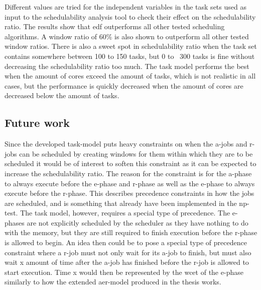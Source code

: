 \documentclass{kththesis}
\begin{document}
Different values are tried for the independent variables in the task sets used as input to the
schedulability analysis tool to check their effect on the schedulability ratio. The results show
that \acrshort{edf} outperforms all other tested scheduling algorithms. A window ratio of 60\% is
also shown to outperform all other tested window ratios. There is also a sweet spot in
schedulability ratio when the task set contains somewhere between 100 to 150 tasks, but 0 to ~300
tasks is fine without decreasing the schedulability ratio too much. The task model performs the best
when the amount of cores exceed the amount of tasks, which is not realistic in all cases, but the
performance is quickly decreased when the amount of cores are decreased below the amount of tasks.







\subsection{Future work}\label{sec:future_work}

Since the developed task-model puts heavy constraints on when the \acrshort{a}-jobs and
\acrshort{r}-jobs can be scheduled by creating windows for them within which they are to be
scheduled it would be of interest to soften this constraint as it can be expected to increase the
schedulability ratio. The reason for the constraint is for the \acrshort{a}-phase to always execute
before the \acrshort{e}-phase and \acrshort{r}-phase as well as the \acrshort{e}-phase to always
execute before the \acrshort{r}-phase. This describes precedence constraints in how the jobs
are scheduled, and is something that already have been implemented in the \acrshort{np}-test. The task model,
however, requires a special type of precedence. The \acrshort{e}-phases are not explicitly scheduled
by the scheduler as they have nothing to do with the memory, but they are still required to finish
execution before the \acrshort{r}-phase is allowed to begin. An idea then could be to pose a special
type of precedence constraint where a \acrshort{r}-job must not only wait for its \acrshort{a}-job
to finish, but must also wait x amount of time after the \acrshort{a}-job has finished before the
\acrshort{r}-job is allowed to start execution. Time x would then be represented by the
\acrshort{wcet} of the \acrshort{e}-phase similarly to how the extended \acrshort{aer}-model
produced in the thesis works. 
\end{document}
